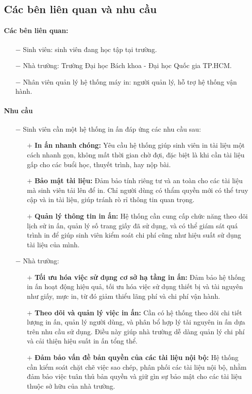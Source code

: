 \documentclass[a4paper]{article}
\begin{document}
\subsection{Các bên liên quan và nhu cầu}
\paragraph*{Các bên liên quan:}
\begin{itemize}
    \item[$-$] Sinh viên: sinh viên đang học tập tại trường.
    \item[$-$] Nhà trường: Trường Đại học Bách khoa - Đại học Quốc gia TP.HCM.
    \item[$-$] Nhân viên quản lý hệ thống máy in: người quản lý, hỗ trợ hệ thống vận hành.
\end{itemize}
\paragraph*{Nhu cầu}
\begin{itemize}
    \item[$-$] Sinh viên cần một hệ thống in ấn đáp ứng các nhu cầu sau:
    \begin{itemize}
        \item[$+$] \textbf{In ấn nhanh chóng:} Yêu cầu hệ thống giúp sinh viên in tài liệu một cách nhanh gọn, không mất thời gian chờ đợi, đặc biệt là khi cần tài liệu gấp cho các buổi học, thuyết trình, hay nộp bài.
        \item[$+$] \textbf{Bảo mật tài liệu:} Đảm bảo tính riêng tư và an toàn cho các tài liệu mà sinh viên tải lên để in. Chỉ người dùng có thẩm quyền mới có thể truy cập và in tài liệu, giúp tránh rò rỉ thông tin quan trọng.
        \item[$+$] \textbf{Quản lý thông tin in ấn:} Hệ thống cần cung cấp chức năng theo dõi lịch sử in ấn, quản lý số trang giấy đã sử dụng, và có thể giám sát quá trình in để giúp sinh viên kiểm soát chi phí cũng như hiệu suất sử dụng tài liệu của mình.
    \end{itemize}
    \item[$-$] Nhà trường:
    \begin{itemize}
        \item[$+$] \textbf{Tối ưu hóa việc sử dụng cơ sở hạ tầng in ấn:} Đảm bảo hệ thống in ấn hoạt động hiệu quả, tối ưu hóa việc sử dụng thiết bị và tài nguyên như giấy, mực in, từ đó giảm thiểu lãng phí và chi phí vận hành.
        \item[$+$] \textbf{Theo dõi và quản lý việc in ấn:} Cần có hệ thống theo dõi chi tiết lượng in ấn, quản lý người dùng, và phân bổ hợp lý tài nguyên in ấn dựa trên nhu cầu sử dụng. Điều này giúp nhà trường dễ dàng quản lý chi phí và cải thiện hiệu suất in ấn tổng thể.
        \item[$+$] \textbf{Đảm bảo vấn đề bản quyền của các tài liệu nội bộ:} Hệ thống cần kiểm soát chặt chẽ việc sao chép, phân phối các tài liệu nội bộ, nhằm đảm bảo việc tuân thủ bản quyền và giữ gìn sự bảo mật cho các tài liệu thuộc sở hữu của nhà trường.
    \end{itemize}
\end{itemize}
\end{document}
